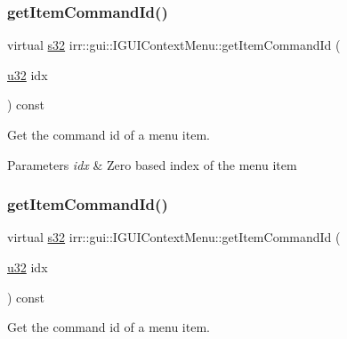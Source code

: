 \subsubsection{\texorpdfstring{get\+Item\+Command\+Id()}{getItemCommandId()}\hspace{0.1cm}{\footnotesize\ttfamily [1/2]}}
{\footnotesize\ttfamily virtual \hyperlink{namespaceirr_ac66849b7a6ed16e30ebede579f9b47c6}{s32} irr\+::gui\+::\+I\+G\+U\+I\+Context\+Menu\+::get\+Item\+Command\+Id (\begin{DoxyParamCaption}\item[{\hyperlink{namespaceirr_a0416a53257075833e7002efd0a18e804}{u32}}]{idx }\end{DoxyParamCaption}) const\hspace{0.3cm}{\ttfamily [pure virtual]}}



Get the command id of a menu item. 


\begin{DoxyParams}{Parameters}
{\em idx} & Zero based index of the menu item \\
\hline
\end{DoxyParams}
\mbox{\label{classirr_1_1gui_1_1IGUIContextMenu_a5edfede62ed558acd68b06eeea0682c3}} 
\subsubsection{\texorpdfstring{get\+Item\+Command\+Id()}{getItemCommandId()}\hspace{0.1cm}{\footnotesize\ttfamily [2/2]}}
{\footnotesize\ttfamily virtual \hyperlink{namespaceirr_ac66849b7a6ed16e30ebede579f9b47c6}{s32} irr\+::gui\+::\+I\+G\+U\+I\+Context\+Menu\+::get\+Item\+Command\+Id (\begin{DoxyParamCaption}\item[{\hyperlink{namespaceirr_a0416a53257075833e7002efd0a18e804}{u32}}]{idx }\end{DoxyParamCaption}) const\hspace{0.3cm}{\ttfamily [pure virtual]}}



Get the command id of a menu item. 


